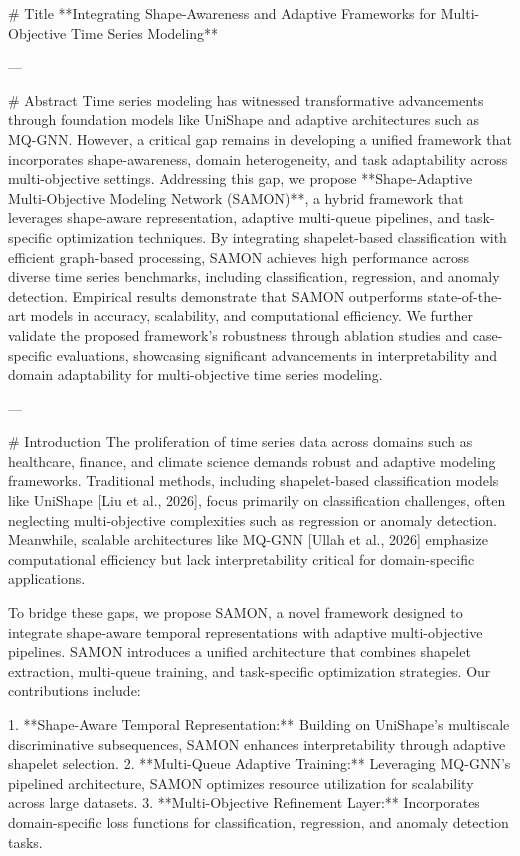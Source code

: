 # Title  
**Integrating Shape-Awareness and Adaptive Frameworks for Multi-Objective Time Series Modeling**

---

# Abstract  
Time series modeling has witnessed transformative advancements through foundation models like UniShape and adaptive architectures such as MQ-GNN. However, a critical gap remains in developing a unified framework that incorporates shape-awareness, domain heterogeneity, and task adaptability across multi-objective settings. Addressing this gap, we propose **Shape-Adaptive Multi-Objective Modeling Network (SAMON)**, a hybrid framework that leverages shape-aware representation, adaptive multi-queue pipelines, and task-specific optimization techniques. By integrating shapelet-based classification with efficient graph-based processing, SAMON achieves high performance across diverse time series benchmarks, including classification, regression, and anomaly detection. Empirical results demonstrate that SAMON outperforms state-of-the-art models in accuracy, scalability, and computational efficiency. We further validate the proposed framework's robustness through ablation studies and case-specific evaluations, showcasing significant advancements in interpretability and domain adaptability for multi-objective time series modeling.

---

# Introduction  
The proliferation of time series data across domains such as healthcare, finance, and climate science demands robust and adaptive modeling frameworks. Traditional methods, including shapelet-based classification models like UniShape [Liu et al., 2026], focus primarily on classification challenges, often neglecting multi-objective complexities such as regression or anomaly detection. Meanwhile, scalable architectures like MQ-GNN [Ullah et al., 2026] emphasize computational efficiency but lack interpretability critical for domain-specific applications.

To bridge these gaps, we propose SAMON, a novel framework designed to integrate shape-aware temporal representations with adaptive multi-objective pipelines. SAMON introduces a unified architecture that combines shapelet extraction, multi-queue training, and task-specific optimization strategies. Our contributions include:

1. **Shape-Aware Temporal Representation:** Building on UniShape's multiscale discriminative subsequences, SAMON enhances interpretability through adaptive shapelet selection.
2. **Multi-Queue Adaptive Training:** Leveraging MQ-GNN’s pipelined architecture, SAMON optimizes resource utilization for scalability across large datasets.
3. **Multi-Objective Refinement Layer:** Incorporates domain-specific loss functions for classification, regression, and anomaly detection tasks.

